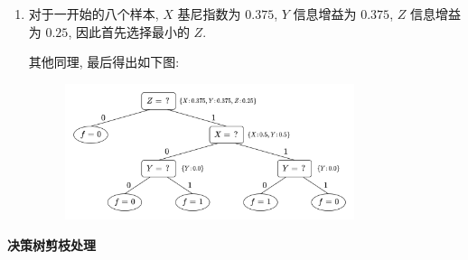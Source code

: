 \documentclass[answers]{exam}  %
\begin{document}
\begin{questions}
\begin{solution}
\begin{enumerate}
      \item

            对于一开始的八个样本, $X$ 基尼指数为 $0.375$, $Y$ 信息增益为 $0.375$, $Z$ 信息增益为 $0.25$, 因此首先选择最小的 $Z$.

            其他同理, 最后得出如下图:


            \begin{figure}[H]
              \centering
              \includegraphics[width=0.8\textwidth]{./figure/PS3-2-2.png}
              \label{Fig.main1}
            \end{figure}
    \end{enumerate}
  \end{solution}


  \question [25] \textbf{决策树剪枝处理} \label{ch4_prob:prunning}


\end{questions}
\end{document}

